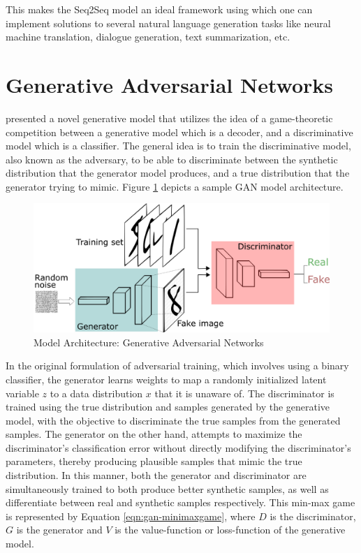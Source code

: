 This makes the Seq2Seq model an ideal framework using which one can implement solutions to several natural language generation tasks like neural machine translation, dialogue generation, text summarization, etc.

\section{Generative Adversarial Networks}

\cite{goodfellow2014generative} presented a novel generative model that utilizes the idea of a game-theoretic competition between a generative model which is a decoder, and a discriminative model which is a classifier. The general idea is to train the discriminative model, also known as the adversary, to be able to discriminate between the synthetic distribution that the generator model produces, and a true distribution that the generator trying to mimic. Figure \ref{fig:gans} depicts a sample GAN model architecture.

\begin{figure}[ht]
	\centering
	\includegraphics[width=\textwidth]{images/gans}
	\caption{\label{fig:gans} Model Architecture: Generative Adversarial Networks}
\end{figure}

In the original formulation of adversarial training, which involves using a binary classifier, the generator learns weights to map a randomly initialized latent variable $z$ to a data distribution $x$ that it is unaware of. The discriminator is trained using the true distribution and samples generated by the generative model, with the objective to discriminate the true samples from the generated samples. The generator on the other hand, attempts to maximize the discriminator's classification error without directly modifying the discriminator's parameters, thereby producing plausible samples that mimic the true distribution. In this manner, both the generator and discriminator are simultaneously trained to both produce better synthetic samples, as well as differentiate between real and synthetic samples respectively. This min-max game is represented by Equation \ref{eqn:gan-minimaxgame}, where $D$ is the discriminator, $G$ is the generator and $V$ is the value-function or loss-function of the generative model.

